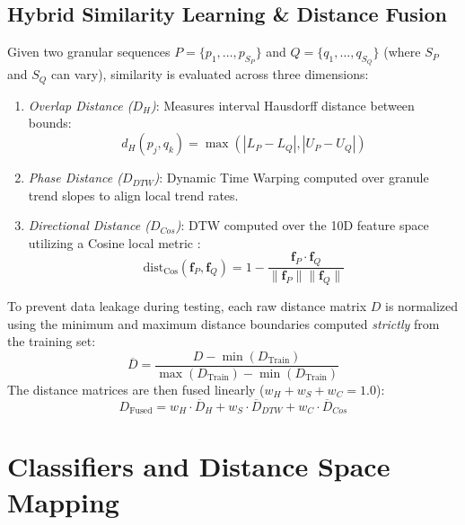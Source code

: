 \documentclass[conference]{IEEEtran}
\begin{document}
\subsection{Hybrid Similarity Learning \& Distance Fusion}
Given two granular sequences $P = \{p_1, \dots, p_{S_P}\}$ and $Q = \{q_1, \dots, q_{S_Q}\}$ (where $S_P$ and $S_Q$ can vary), similarity is evaluated across three dimensions:
\begin{enumerate}
    \item \textit{Overlap Distance ($D_H$)}: Measures interval Hausdorff distance between bounds:
    \begin{equation}
    d_H(p_j, q_k) = \max \left( |L_P - L_Q|, |U_P - U_Q| \right)
    \label{eq:hausdorff_dist}
    \end{equation}
    \item \textit{Phase Distance ($D_{DTW}$)}: Dynamic Time Warping computed over granule trend slopes to align local trend rates.
    \item \textit{Directional Distance ($D_{Cos}$)}: DTW computed over the 10D feature space utilizing a Cosine local metric \cite{sakoe1978}:
    \begin{equation}
    \text{dist}_{\text{Cos}}(\mathbf{f}_P, \mathbf{f}_Q) = 1 - \frac{\mathbf{f}_P \cdot \mathbf{f}_Q}{\|\mathbf{f}_P\| \|\mathbf{f}_Q\|}
    \label{eq:cosine_dist}
    \end{equation}
\end{enumerate}

To prevent data leakage during testing, each raw distance matrix $D$ is normalized using the minimum and maximum distance boundaries computed \textit{strictly} from the training set:
\begin{equation}
\overline{D} = \frac{D - \min(D_{\text{Train}})}{\max(D_{\text{Train}}) - \min(D_{\text{Train}})}
\label{eq:normalized_dist}
\end{equation}
The distance matrices are then fused linearly ($w_H + w_S + w_C = 1.0$):
\begin{equation}
D_{\text{Fused}} = w_H \cdot \overline{D}_H + w_S \cdot \overline{D}_{DTW} + w_C \cdot \overline{D}_{Cos}
\label{eq:fused_dist}
\end{equation}

\section{Classifiers and Distance Space Mapping}
\end{document}
